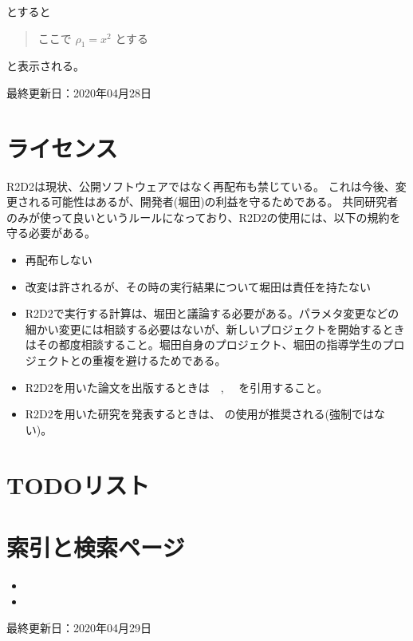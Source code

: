 \documentclass[letterpaper,10pt,dvipdfmx,report]{sphinxmanual}
\begin{document}
とすると
\begin{quote}

ここで \(\rho_1=x^2\) とする
\end{quote}

と表示される。

最終更新日：2020年04月28日


\chapter{ライセンス}
\label{\detokenize{index:id1}}
R2D2は現状、公開ソフトウェアではなく再配布も禁じている。
これは今後、変更される可能性はあるが、開発者(堀田)の利益を守るためである。
共同研究者のみが使って良いというルールになっており、R2D2の使用には、以下の規約を守る必要がある。
\begin{itemize}
\item {} 
再配布しない

\item {} 
改変は許されるが、その時の実行結果について堀田は責任を持たない

\item {} 
R2D2で実行する計算は、堀田と議論する必要がある。パラメタ変更などの細かい変更には相談する必要はないが、新しいプロジェクトを開始するときはその都度相談すること。堀田自身のプロジェクト、堀田の指導学生のプロジェクトとの重複を避けるためである。

\item {} 
R2D2を用いた論文を出版するときは　, 　を引用すること。

\item {} 
R2D2を用いた研究を発表するときは、 の使用が推奨される(強制ではない)。

\end{itemize}


\chapter{TODOリスト}
\label{\detokenize{index:todo}}

\chapter{索引と検索ページ}
\label{\detokenize{index:id3}}\begin{itemize}
\item {} 

\item {} 

\end{itemize}

最終更新日：2020年04月29日


\renewcommand{\indexname}{Pythonモジュール索引}
\begin{sphinxtheindex}
\let\bigletter\sphinxstyleindexlettergroup
\bigletter{r}
\item\relax{}
\end{sphinxtheindex}

\renewcommand{\indexname}{索引}
\printindex
\end{document}
